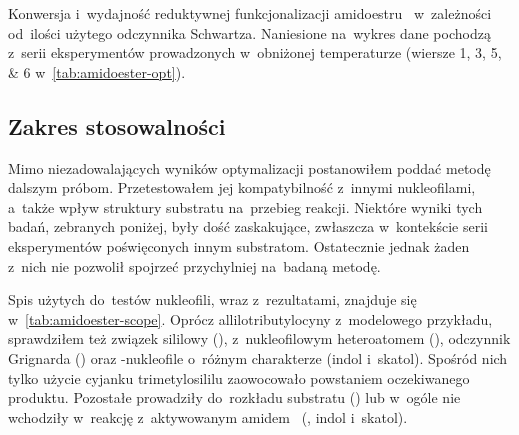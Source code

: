 \begin{marginfigure}
  \caption{
    Konwersja i~wydajność reduktywnej funkcjonalizacji amidoestru~
      w~zależności od~ilości użytego odczynnika Schwartza.
    Naniesione na~wykres dane pochodzą z~serii eksperymentów prowadzonych w~obniżonej temperaturze
      (wiersze \numlist{1; 3; 5; 6} w~\cref{tab:amidoester-opt}).
  }
  \label{fig:amidoester-opt-plot}
\end{marginfigure}

\subsection{Zakres stosowalności}
Mimo niezadowalających wyników optymalizacji postanowiłem poddać metodę dalszym próbom.
Przetestowałem jej kompatybilność z~innymi nukleofilami, a~także wpływ struktury substratu
  na~przebieg reakcji.
Niektóre wyniki tych badań, zebranych poniżej, były dość zaskakujące, zwłaszcza w~kontekście
  serii eksperymentów poświęconych innym substratom.
Ostatecznie jednak żaden z~nich nie pozwolił spojrzeć przychylniej na~badaną metodę.

Spis użytych do~testów nukleofili, wraz z~rezultatami, znajduje się w~\cref{tab:amidoester-scope}.
Oprócz allilotributylocyny z~modelowego przykładu, sprawdziłem też związek sililowy
  (), z~nukleofilowym heteroatomem (),
  odczynnik Grignarda () oraz \textpi{}-nukleofile o~różnym charakterze
  (indol i~skatol).
Spośród nich tylko użycie cyjanku trimetylosililu zaowocowało powstaniem oczekiwanego produktu.
Pozostałe prowadziły do~rozkładu substratu () lub w~ogóle nie wchodziły
  w~reakcję z~aktywowanym amidem~ (, indol i~skatol).


